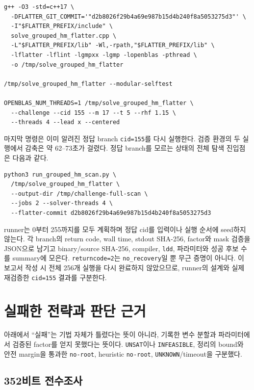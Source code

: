\documentclass[10pt,a4paper]{article}
\begin{document}
\begin{lstlisting}
g++ -O3 -std=c++17 \
  -DFLATTER_GIT_COMMIT='"d2b8026f29b4a69e987b15d4b240f8a5053275d3"' \
  -I"$FLATTER_PREFIX/include" \
  solve_grouped_hm_flatter.cpp \
  -L"$FLATTER_PREFIX/lib" -Wl,-rpath,"$FLATTER_PREFIX/lib" \
  -lflatter -lflint -lgmpxx -lgmp -lopenblas -pthread \
  -o /tmp/solve_grouped_hm_flatter

/tmp/solve_grouped_hm_flatter --modular-selftest

OPENBLAS_NUM_THREADS=1 /tmp/solve_grouped_hm_flatter \
  --challenge --cid 155 --m 17 --t 5 --rhf 1.15 \
  --threads 4 --lead x --centered
\end{lstlisting}

마지막 명령은 이미 알려진 정답 branch \texttt{cid=155}를 다시 실행한다.
검증 환경의 두 실행에서 감축은 약 62--73초가 걸렸다. 정답 branch를 모르는
상태의 전체 탐색 진입점은 다음과 같다.

\begin{lstlisting}
python3 run_grouped_hm_scan.py \
  /tmp/solve_grouped_hm_flatter \
  --output-dir /tmp/challenge-full-scan \
  --jobs 2 --solver-threads 4 \
  --flatter-commit d2b8026f29b4a69e987b15d4b240f8a5053275d3
\end{lstlisting}

runner는 0부터 255까지를 모두 계획하며 정답 cid를 입력이나 실행 순서에
seed하지 않는다. 각 branch의 return code, wall time, stdout SHA-256,
factor와 mask 검증을 JSON으로 남기고 binary/source SHA-256, compiler,
\texttt{ldd}, 파라미터와 성공 후보 수를 summary에 모은다.
\texttt{returncode=2}는 \texttt{no\_recovery}일 뿐 무근 증명이 아니다.
이 보고서 작성 시 전체 256개 실행을 다시 완료하지 않았으므로, runner의
설계와 실제 재검증한 \texttt{cid=155} 결과를 구분한다.

\section{실패한 전략과 판단 근거}

아래에서 ``실패''는 기법 자체가 틀렸다는 뜻이 아니라, 기록한 변수 분할과
파라미터에서 검증된 factor를 얻지 못했다는 뜻이다. \texttt{UNSAT}이나
\texttt{INFEASIBLE}, 정리의 bound와 안전 margin을 통과한
\texttt{no-root}, heuristic \texttt{no-root},
\texttt{UNKNOWN}/timeout을 구분했다.


\subsection{352비트 전수조사}
\end{document}
